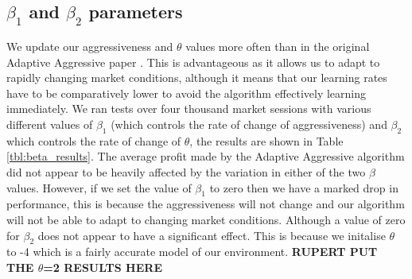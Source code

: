 \documentclass[preprint]{acm_proc_article-sp} %
\begin{document}
\subsection{$\beta_1$ and $\beta_2$ parameters} \label{sec:calibration_beta}
We update our aggressiveness and $\theta$ values more often than in the original
Adaptive Aggressive paper \cite{AA_thesis}. This is advantageous as it
allows us to adapt to rapidly changing market conditions, although it means that our learning rates 
have to be comparatively lower to avoid the algorithm effectively learning immediately.
We ran tests over four thousand market sessions with various different values of $\beta_1$ (which
controls the rate of change of aggressiveness) and $\beta_2$ which controls the
rate of change of $\theta$, the results are shown in Table \ref{tbl:beta_results}.
The average profit made by the Adaptive Aggressive algorithm did not appear to
be heavily affected by the variation in either of the two $\beta$ values.
However, if we set the value of $\beta_1$ to zero then we have a marked drop in
performance, this is because the aggressiveness will not change and our
algorithm will not be able to adapt to changing market conditions. Although a
value of zero for $\beta_2$ does not appear to have a significant effect. This
is because we initalise $\theta$ to -4 which is a fairly accurate model of our
environment. \textbf{RUPERT PUT THE $\theta$=2 RESULTS HERE}
\end{document}
